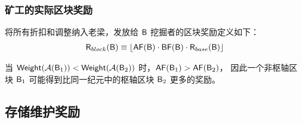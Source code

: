 \subsubsection{矿工的实际区块奖励}
\label{subsubsec:actualblockaward}
将所有折扣和调整纳入老梁，发放给 $\textsf{B}$ 挖掘者的区块奖励定义如下：
	\begin{align}
		\textsf{R}_{block}(\textsf{B}) \equiv \left\lfloor\mathsf{AF}(\textsf{B})\cdot \mathsf{BF}(\textsf{B})
		\cdot \textsf{R}_{base}(\textsf{B})\right\rfloor
	\end{align}


当 $\mathsf{Weight}(\mathcal{A}(\textsf{B}_1))<\mathsf{Weight}(\mathcal{A}(\textsf{B}_2))$ 时，$\mathsf{AF}(\textsf{B}_1)>\mathsf{AF}(\textsf{B}_2)$， 因此一个非枢轴区块 $\textsf{B}_1$ 可能得到比同一纪元中的枢轴区块 $\textsf{B}_2$ 更多的奖励。	


\subsection{存储维护奖励}
	\label{subsec:storagefee}

